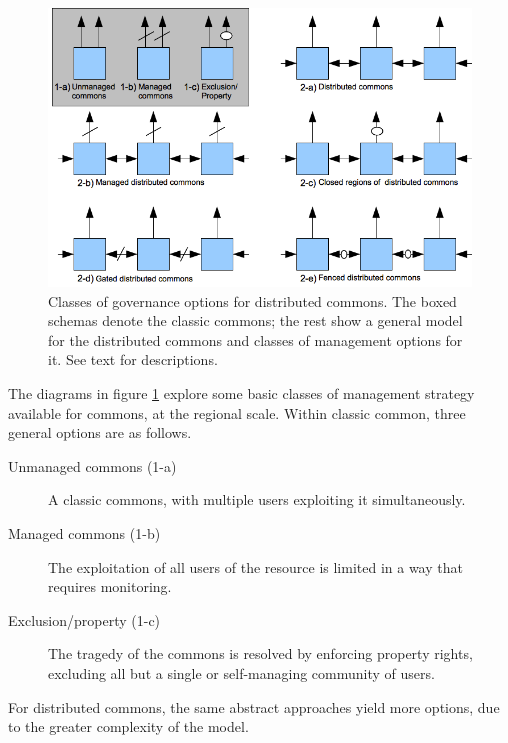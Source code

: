 \documentclass[12pt, oneside]{amsart}
\begin{document}
\begin{figure}[htp]
  \includegraphics[width=6.5in]{diagrams.png}
  \caption{Classes of governance options for distributed commons.  The boxed schemas denote the classic commons; the rest show a general model for the distributed commons and classes of management options for it.  See text for descriptions.}
  \label{fig:diagrams}
\end{figure}

The diagrams in figure \ref{fig:diagrams} explore some basic classes of management strategy available for commons, at the regional scale.  Within classic common, three general options are as follows.

\begin{description}
  \item[Unmanaged commons (1-a)]
    A classic commons, with multiple users exploiting it simultaneously.
  \item[Managed commons (1-b)]
    The exploitation of all users of the resource is limited in a way that requires monitoring.
  \item[Exclusion/property (1-c)]
    The tragedy of the commons is resolved by enforcing property rights, excluding all but a single or self-managing community of users.
\end{description}

For distributed commons, the same abstract approaches yield more options, due to the greater complexity of the model.
\end{document}
